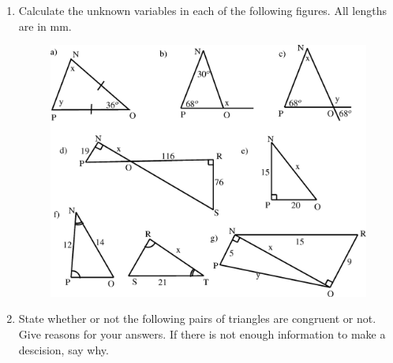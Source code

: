           \label{m39368*id318528}\begin{enumerate}[noitemsep, label=\textbf{\arabic*}. ] 
            \label{m39368*uid50}\item Calculate the unknown variables in each of the following figures. All
lengths are in mm.

    \setcounter{subfigure}{0}


	\begin{figure}[H] %
    \begin{center}
    \label{m39368*id318548!!!underscore!!!media}\label{m39368*id318548!!!underscore!!!printimage}\includegraphics{col11306.imgs/m39368_MG10C13_038.png} %
        
      \vspace{2pt}
    \vspace{.1in}
    
    \end{center}

 \end{figure}   

    \addtocounter{footnote}{-0}
            \label{m39368*uid51}\item State whether or not the following pairs of triangles are congruent or not.
Give reasons for your answers. If there is not enough information to make a
descision, say why.

    \setcounter{subfigure}{0}



\end{enumerate}
